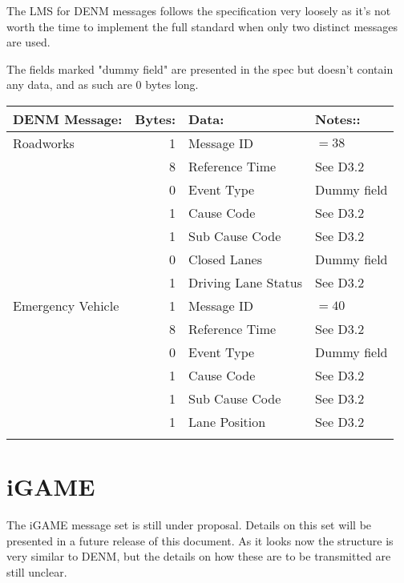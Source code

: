 \documentclass[11pt]{article}
\begin{document}
The LMS for DENM messages follows the specification very loosely as
it's not worth the time to implement the full standard when only two
distinct messages are used. 

The fields marked "dummy field" are presented in the spec but doesn't
contain any data, and as such are 0 bytes long.

\begin{center}
\begin{tabular}{lrll}
\hline
DENM Message: & Bytes: & Data: & Notes::\\
\hline
Roadworks & 1 & Message ID & \(=38\)\\
 & 8 & Reference Time & See D3.2\\
 & 0 & Event Type & Dummy field\\
 & 1 & Cause Code & See D3.2\\
 & 1 & Sub Cause Code & See D3.2\\
 & 0 & Closed Lanes & Dummy field\\
 & 1 & Driving Lane Status & See D3.2\\
\hline
Emergency Vehicle & 1 & Message ID & \(=40\)\\
 & 8 & Reference Time & See D3.2\\
 & 0 & Event Type & Dummy field\\
 & 1 & Cause Code & See D3.2\\
 & 1 & Sub Cause Code & See D3.2\\
 & 1 & Lane Position & See D3.2\\
 &  &  & \\
\end{tabular}
\end{center}


\newpage
\section{iGAME}
\label{sec:orgheadline4}
The iGAME message set is still under proposal. Details on this set
will be presented in a future release of this document. As it looks
now the structure is very similar to DENM, but the details on how
these are to be transmitted are still unclear.
\end{document}
